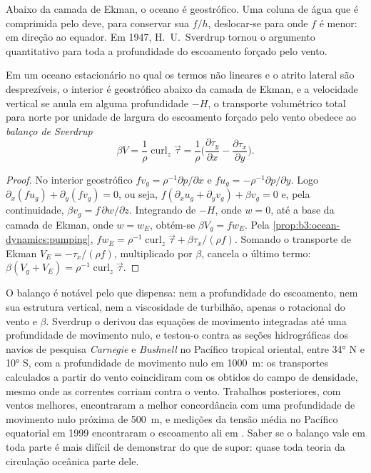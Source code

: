 Abaixo da camada de Ekman, o oceano é geostrófico. Uma coluna de água que é
comprimida pelo  deve, para conservar sua  $f/h$,
deslocar-se para onde $f$ é menor: em direção ao equador. Em 1947, H.~U.~Sverdrup
tornou o argumento quantitativo para toda a profundidade do escoamento forçado pelo vento.

\begin{theorem}\label{thm:b3:ocean-dynamics:sverdrup}
Em um oceano estacionário no qual os termos não lineares e o atrito lateral
são desprezíveis, o interior é geostrófico abaixo da camada de Ekman, e a
velocidade vertical se anula em alguma profundidade $-H$, o transporte volumétrico total para norte
por unidade de largura do escoamento forçado pelo vento obedece ao \emph{balanço
de Sverdrup}
\[
\beta V = \frac{1}{\rho}\operatorname{curl}_z\vec\tau
= \frac{1}{\rho}\Big(\frac{\partial\tau_y}{\partial x} -
\frac{\partial\tau_x}{\partial y}\Big) .
\]
\end{theorem}

\begin{proof}
No interior geostrófico $fv_g = \rho^{-1}\partial p/\partial x$ e
$fu_g = -\rho^{-1}\partial p/\partial y$. Logo $\partial_x(fu_g) +
\partial_y(fv_g) = 0$, ou seja, $f(\partial_xu_g + \partial_yv_g) + \beta
v_g = 0$ e, pela continuidade, $\beta v_g = f\,\partial w/\partial z$.
Integrando de $-H$, onde $w = 0$, até a base da camada de Ekman,
onde $w = w_E$, obtém-se $\beta V_g = fw_E$. Pela
\cref{prop:b3:ocean-dynamics:pumping}, $fw_E = \rho^{-1}\operatorname{curl}_z
\vec\tau + \beta\tau_x/(\rho f)$. Somando o transporte de Ekman $V_E =
-\tau_x/(\rho f)$, multiplicado por $\beta$, cancela o último termo:
$\beta(V_g + V_E) = \rho^{-1}\operatorname{curl}_z\vec\tau$.
\end{proof}

O balanço é notável pelo que dispensa: nem a profundidade do
escoamento, nem sua estrutura vertical, nem a viscosidade de turbilhão, apenas o
rotacional do vento e $\beta$. Sverdrup o derivou das equações de
movimento integradas até uma profundidade de movimento nulo, e testou-o contra as
seções hidrográficas dos navios de pesquisa \emph{Carnegie} e
\emph{Bushnell} no Pacífico tropical oriental, entre \ang{34} N e
\ang{10} S, com a profundidade de movimento nulo em \qty{1000}{m}: os transportes
calculados a partir do vento coincidiram com os obtidos do campo de densidade, mesmo
onde as correntes corriam contra o vento. Trabalhos posteriores, com ventos melhores,
encontraram a melhor concordância com uma profundidade de movimento nulo próxima de \qty{500}{m}, e
medições da tensão média no Pacífico equatorial em 1999 encontraram o
escoamento ali em . Saber se o balanço vale em toda parte é
mais difícil de demonstrar do que de supor: quase toda teoria da circulação oceânica
parte dele.

